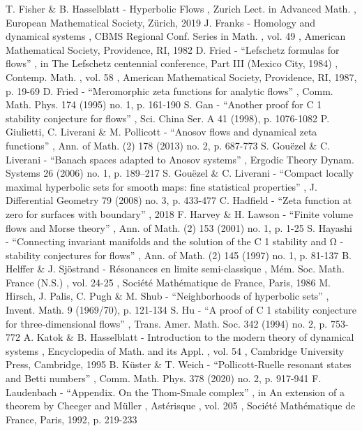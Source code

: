  T. Fisher \& B. Hasselblatt - Hyperbolic Flows , Zurich Lect. in Advanced Math. , European Mathematical Society, Zürich, 2019
 J. Franks - Homology and dynamical systems , CBMS Regional Conf. Series in Math. , vol. 49 , American Mathematical Society, Providence, RI, 1982
 D. Fried - “Lefschetz formulas for flows” , in The Lefschetz centennial conference, Part III (Mexico City, 1984) , Contemp. Math. , vol. 58 , American Mathematical Society, Providence, RI, 1987, p. 19-69
 D. Fried - “Meromorphic zeta functions for analytic flows” , Comm. Math. Phys. 174 (1995) no. 1, p. 161-190
 S. Gan - “Another proof for C 1 stability conjecture for flows” , Sci. China Ser. A 41 (1998), p. 1076-1082
 P. Giulietti, C. Liverani \& M. Pollicott - “Anosov flows and dynamical zeta functions” , Ann. of Math. (2) 178 (2013) no. 2, p. 687-773
 S. Gouëzel \& C. Liverani - “Banach spaces adapted to Anosov systems” , Ergodic Theory Dynam. Systems 26 (2006) no. 1, p. 189–217
 S. Gouëzel \& C. Liverani - “Compact locally maximal hyperbolic sets for smooth maps: fine statistical properties” , J. Differential Geometry 79 (2008) no. 3, p. 433-477
 C. Hadfield - “Zeta function at zero for surfaces with boundary” , 2018
 F. Harvey \& H. Lawson - “Finite volume flows and Morse theory” , Ann. of Math. (2) 153 (2001) no. 1, p. 1-25
 S. Hayashi - “Connecting invariant manifolds and the solution of the C 1 stability and Ω -stability conjectures for flows” , Ann. of Math. (2) 145 (1997) no. 1, p. 81-137
 B. Helffer \& J. Sjöstrand - Résonances en limite semi-classique , Mém. Soc. Math. France (N.S.) , vol. 24-25 , Société Mathématique de France, Paris, 1986
 M. Hirsch, J. Palis, C. Pugh \& M. Shub - “Neighborhoods of hyperbolic sets” , Invent. Math. 9 (1969/70), p. 121-134
 S. Hu - “A proof of C 1 stability conjecture for three-dimensional flows” , Trans. Amer. Math. Soc. 342 (1994) no. 2, p. 753-772
 A. Katok \& B. Hasselblatt - Introduction to the modern theory of dynamical systems , Encyclopedia of Math. and its Appl. , vol. 54 , Cambridge University Press, Cambridge, 1995
 B. Küster \& T. Weich - “Pollicott-Ruelle resonant states and Betti numbers” , Comm. Math. Phys. 378 (2020) no. 2, p. 917-941
 F. Laudenbach - “Appendix. On the Thom-Smale complex” , in An extension of a theorem by Cheeger and Müller , Astérisque , vol. 205 , Société Mathématique de France, Paris, 1992, p. 219-233
